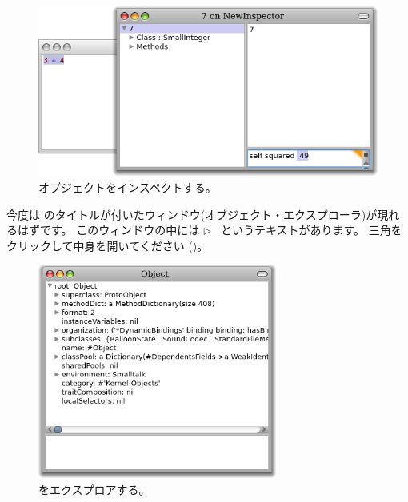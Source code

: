 \documentclass[a4paper,10pt,twoside]{book}
\begin{document}
\begin{figure}[htb]
\centerline {\includegraphics[width=\textwidth]{InspectIt}}
\caption{オブジェクトをインスペクトする。}
\end{figure}



今度は  のタイトルが付いたウィンドウ(オブジェクト・エクスプローラ)が現れるはずです。
このウィンドウの中には \mbox{$\triangleright$ } というテキストがあります。
三角をクリックして中身を開いてください ()。

\begin{figure}[htb]
\centerline {\includegraphics[width=0.7\textwidth]{ExploreIt}}
\caption{ をエクスプロアする。}
\end{figure}
\end{document}
